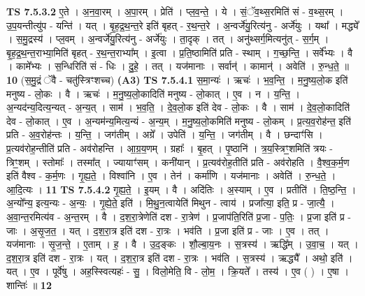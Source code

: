 \documentclass[17pt]{extarticle}
\begin{document}
                  \newline
                                \textbf{ TS 7.5.3.2} \newline
                  ए॒ते । अ॒न॒वा॒रम् । अ॒पा॒रम् । प्रेति॑ । प्ल॒व॒न्ते॒ । ये । सं॒ॅव॒थ्स॒रमिति॑ सं - व॒थ्स॒रम् । उ॒प॒यन्तीत्यु॑प - यन्ति॑ । यत् । बृ॒ह॒द्र॒थ॒न्त॒रे इति॑ बृहत् - र॒थ॒न्त॒रे । अ॒न्वर्जे॑यु॒रित्य॑नु - अर्जे॑युः । यथा᳚ । मद्ध्ये᳚ । स॒मु॒द्रस्य॑ । प्ल॒वम् । अ॒न्वर्जे॑यु॒रित्य॑नु - अर्जे॑युः । ता॒दृक् । तत् । अनु॑थ्सर्ग॒मित्यनु॑त् - स॒र्ग॒म् । बृ॒ह॒द्र॒थ॒न्त॒राभ्या॒मिति॑ बृहत् - र॒थ॒न्त॒राभ्या᳚म् । इ॒त्वा । प्र॒ति॒ष्ठामिति॑ प्रति -  स्थाम् । ग॒च्छ॒न्ति॒ । सर्वे᳚भ्यः । वै । कामे᳚भ्यः । स॒न्धिरिति॑ सं - धिः । दु॒हे॒ । तत् । यज॑मानाः ।  सर्वान्॑ । कामान्॑ । अवेति॑ । रु॒न्ध॒ते॒ ॥ \textbf{  10} \newline
                  \newline
                      (स॒मु॒द्रं ॅवै - चतु॑स्त्रिꣳशच्च)  \textbf{(A3)} \newline \newline
                                \textbf{ TS 7.5.4.1} \newline
                  स॒मा॒न्यः॑ । ऋचः॑ । भ॒व॒न्ति॒ । म॒नु॒ष्य॒लो॒क इति॑ मनुष्य - लो॒कः । वै । ऋचः॑ । म॒नु॒ष्य॒लो॒कादिति॑ मनुष्य - लो॒कात् । ए॒व । न । य॒न्ति॒ । अ॒न्यद॑न्य॒दित्य॒न्यत् - अ॒न्य॒त् । साम॑ । भ॒व॒ति॒ । दे॒व॒लो॒क इति॑ देव - लो॒कः । वै । साम॑ । दे॒व॒लो॒कादिति॑ देव - लो॒कात् । ए॒व । अ॒न्यम॑न्य॒मित्य॒न्यं - अ॒न्य॒म् । म॒नु॒ष्य॒लो॒कमिति॑ मनुष्य - लो॒कम् । प्र॒त्य॒व॒रोह॑न्त॒ इति॑ प्रति - अ॒व॒रोह॑न्तः । य॒न्ति॒ । जग॑तीम् । अग्रे᳚ । उपेति॑ । य॒न्ति॒ । जग॑तीम् । वै । छन्दाꣳ॑सि । प्र॒त्यव॑रोह॒न्तीति॑ प्रति - अव॑रोहन्ति । आ॒ग्र॒य॒णम् । ग्रहाः᳚ । बृ॒हत् । पृ॒ष्ठानि॑ । त्र॒य॒स्त्रिꣳ॒॒शमिति॑ त्रयः - त्रिꣳ॒॒शम् । स्तोमाः᳚ । तस्मा᳚त् । ज्यायाꣳ॑सम् । कनी॑यान् । प्र॒त्यव॑रोह॒तीति॑ प्रति - अव॑रोहति । वै॒श्व॒क॒र्म॒ण इति॑ वैश्व - क॒र्म॒णः । गृ॒ह्य॒ते॒ । विश्वा॑नि । ए॒व । तेन॑ । कर्मा॑णि । यज॑मानाः । अवेति॑ । रु॒न्ध॒ते॒ । आ॒दि॒त्यः । \textbf{  11} \newline
                  \newline
                                \textbf{ TS 7.5.4.2} \newline
                  गृ॒ह्य॒ते॒ । इ॒यम् । वै । अदि॑तिः । अ॒स्याम् । ए॒व । प्रतीति॑ । ति॒ष्ठ॒न्ति॒ । अ॒न्यो᳚न्य॒ इत्य॒न्यः - अ॒न्यः॒ । गृ॒ह्ये॒ते॒ इति॑ । मि॒थु॒न॒त्वायेति॑ मिथुन - त्वाय॑ । प्रजा᳚त्या॒ इति॒ प्र - जा॒त्यै॒ । अ॒वा॒न्त॒रमित्य॑व - अ॒न्त॒रम् । वै । द॒श॒रा॒त्रेणेति॑ दश - रा॒त्रेण॑ । प्र॒जाप॑ति॒रिति॑ प्र॒जा - प॒तिः॒ । प्र॒जा इति॑ प्र - जाः । अ॒सृ॒ज॒त॒ । यत् । द॒श॒रा॒त्र इति॑ दश - रा॒त्रः । भव॑ति । प्र॒जा इति॑ प्र - जाः । ए॒व । तत् । यज॑मानाः । सृ॒ज॒न्ते॒ । ए॒ताम् । ह॒ । वै । उ॒द॒ङ्कः । शौ॒ल्बा॒य॒नः । स॒त्रस्य॑ । ऋद्धि᳚म् । उ॒वा॒च॒ । यत् । द॒श॒रा॒त्र इति॑ दश - रा॒त्रः । यत् । द॒श॒रा॒त्र इति॑ दश - रा॒त्रः । भव॑ति । स॒त्रस्य॑ । ऋद्ध्यै᳚ । अथो॒ इति॑ । यत् । ए॒व । पूर्वे॑षु । अह॒स्स्वित्यहः॑ - सु॒ । विलो॒मेति॒ वि - लो॒म॒ । क्रि॒यते᳚ । तस्य॑ । ए॒व ( ) । ए॒षा । शान्तिः॑ ॥ \textbf{  12} \newline
\end{document}
